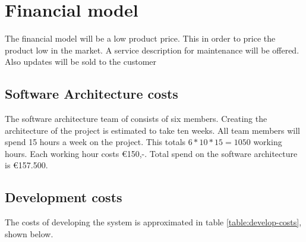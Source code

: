 \section{Financial model}
The financial model will be a low product price. This in order to price the product low in the market. A service description for maintenance will be offered. Also updates will be sold to the customer\\
\subsection{Software Architecture costs}
The software architecture team of \CompanyName consists of six members. Creating the architecture of the project is estimated to take ten weeks. All team members will spend 15 hours a week on the project. This totals $6*10*15=1050$ working hours. Each working hour costs \euro{}150,-. Total spend on the software architecture is \euro{}157.500.
\subsection{Development costs}
The costs of developing the system is approximated in table \ref{table:develop-costs}, shown below.


